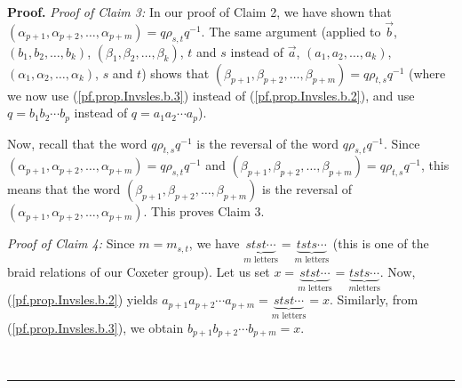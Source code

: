\documentclass[numbers=enddot,12pt,final,onecolumn,notitlepage,abstracton]{scrartcl}%
\theoremstyle{definition}
\newenvironment{proof}[1][Proof]{\noindent\textbf{#1.} }{\ \rule{0.5em}{0.5em}}
\begin{document}
\begin{proof}
\textit{Proof of Claim 3:} In our proof of Claim 2, we have shown that
$\left(  \alpha_{p+1},\alpha_{p+2},\ldots,\alpha_{p+m}\right)  =q\rho
_{s,t}q^{-1}$. The same argument (applied to $\overrightarrow{b}$, $\left(
b_{1},b_{2},\ldots,b_{k}\right)  $, $\left(  \beta_{1},\beta_{2},\ldots
,\beta_{k}\right)  $, $t$ and $s$ instead of $\overrightarrow{a}$, $\left(
a_{1},a_{2},\ldots,a_{k}\right)  $, $\left(  \alpha_{1},\alpha_{2}%
,\ldots,\alpha_{k}\right)  $, $s$ and $t$) shows that $\left(  \beta
_{p+1},\beta_{p+2},\ldots,\beta_{p+m}\right)  =q\rho_{t,s}q^{-1}$ (where we
now use (\ref{pf.prop.Invsles.b.3}) instead of (\ref{pf.prop.Invsles.b.2}),
and use $q=b_{1}b_{2}\cdots b_{p}$ instead of $q=a_{1}a_{2}\cdots a_{p}$).

Now, recall that the word $q\rho_{t,s}q^{-1}$ is the reversal of the word
$q\rho_{s,t}q^{-1}$. Since \newline$\left(  \alpha_{p+1},\alpha_{p+2}%
,\ldots,\alpha_{p+m}\right)  =q\rho_{s,t}q^{-1}$ and $\left(  \beta
_{p+1},\beta_{p+2},\ldots,\beta_{p+m}\right)  =q\rho_{t,s}q^{-1}$, this means
that the word $\left(  \beta_{p+1},\beta_{p+2},\ldots,\beta_{p+m}\right)  $ is
the reversal of $\left(  \alpha_{p+1},\alpha_{p+2},\ldots,\alpha_{p+m}\right)
$. This proves Claim 3.

\textit{Proof of Claim 4:} Since $m=m_{s,t}$, we have $\underbrace{stst\cdots
}_{m\text{ letters}}=\underbrace{tsts\cdots}_{m\text{ letters}}$ (this is one
of the braid relations of our Coxeter group). Let us set
$x=\underbrace{stst\cdots}_{m\text{ letters}}=\underbrace{tsts\cdots}_{m\text{
letters}}$. Now, (\ref{pf.prop.Invsles.b.2}) yields $a_{p+1}a_{p+2}\cdots
a_{p+m}=\underbrace{stst\cdots}_{m\text{ letters}}=x$. Similarly, from
(\ref{pf.prop.Invsles.b.3}), we obtain $b_{p+1}b_{p+2}\cdots b_{p+m}=x$.


\end{proof}
\end{document}
